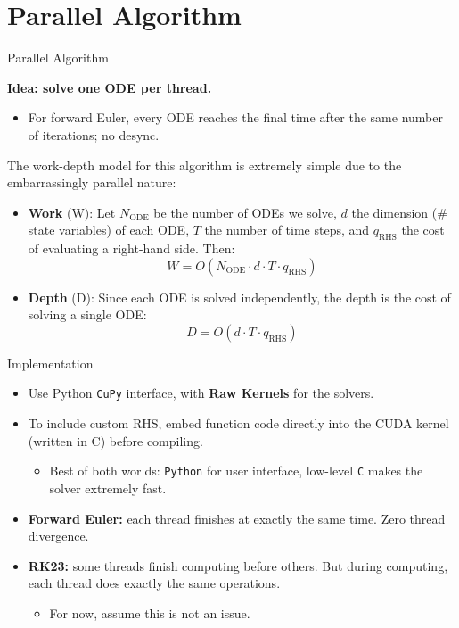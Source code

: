 \section{Parallel Algorithm}

\begin{frame}{Parallel Algorithm}
    
\textbf{Idea: solve one ODE per thread.}
\begin{itemize}
\item For forward Euler, every ODE reaches the final time after the same number of iterations; no desync.
\end{itemize}

The work-depth model for this algorithm is extremely simple due to the embarrassingly parallel nature:
\begin{itemize}
\item \textbf{Work} (W): Let $N_{\mathrm{ODE}}$ be the number of ODEs we solve, $d$ the dimension (\# state variables) of each ODE, $T$ the number of time steps, and $q_{\mathrm{RHS}}$ the cost of evaluating a right-hand side. Then:
$$W = O(N_{\mathrm{ODE}} \cdot d\cdot T \cdot q_{\mathrm{RHS}})$$
\item \textbf{Depth} (D): Since each ODE is solved independently, the depth is the cost of solving a single ODE:
$$D = O(d \cdot T \cdot q_{\mathrm{RHS}})$$

\end{itemize}
\end{frame}

\begin{frame}{Implementation}
\begin{itemize}
\item Use Python \texttt{CuPy} interface, with \textbf{Raw Kernels} for the solvers.
\item To include custom RHS, embed function code directly into the CUDA kernel (written in C) before compiling.
\begin{itemize}
    \item Best of both worlds: \texttt{Python} for user interface, low-level \texttt{C} makes the solver extremely fast.
\end{itemize}


\item \textbf{Forward Euler:} each thread finishes at exactly the same time. Zero thread divergence.
\item \textbf{RK23:} some threads finish computing before others. But during computing, each thread does exactly the same operations. 
\begin{itemize}
    \item For now, assume this is not an issue.
\end{itemize}

\end{itemize}

\end{frame}


